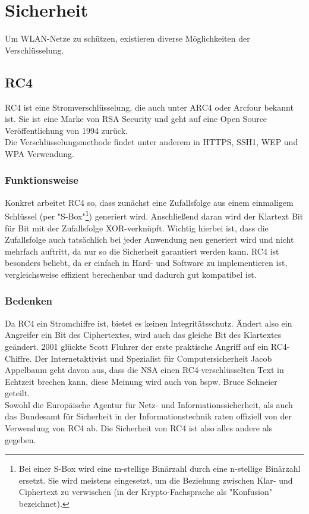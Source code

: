 \documentclass[a4paper,13pt]{scrartcl}
\begin{document}
\section{Sicherheit}
Um WLAN-Netze zu schützen, existieren diverse Möglichkeiten der Verschlüsselung. 
\subsection{RC4}
RC4 ist eine Stromverschlüsselung, die auch unter ARC4 oder Arcfour bekannt ist. Sie ist eine Marke von RSA Security und geht auf eine Open Source Veröffentlichung von 1994 zurück.\\
Die Verschlüsselungsmethode findet unter anderem in HTTPS, SSH1, WEP und WPA Verwendung.
\subsubsection{Funktionsweise}
Konkret arbeitet RC4 so, dass zunächst eine Zufallsfolge aus einem einmaligem Schlüssel (per "S-Box"\footnote{Bei einer S-Box wird eine m-stellige Binärzahl durch eine n-stellige Binärzahl ersetzt. Sie wird meistens eingesetzt, um die Beziehung zwischen Klar- und Ciphertext zu verwischen (in der Krypto-Fachsprache als "Konfusion" bezeichnet).}) generiert wird. Anschließend daran wird der Klartext Bit für Bit mit der Zufallsfolge XOR-verknüpft. Wichtig hierbei ist, dass die Zufallsfolge auch tatsächlich bei jeder Anwendung neu generiert wird und nicht mehrfach auftritt, da nur so die Sicherheit garantiert werden kann. RC4 ist besonders beliebt, da er einfach in Hard- und Software zu implementieren ist, vergleichsweise effizient berechenbar und dadurch gut kompatibel ist.
\subsubsection{Bedenken}
Da RC4 ein Stromchiffre ist, bietet es keinen Integritätsschutz. Ändert also ein Angreifer ein Bit des Ciphertextes, wird auch das gleiche Bit des Klartextes geändert. 2001 glückte Scott Fluhrer der erste praktische Angriff auf ein RC4-Chiffre. Der Internetaktivist und Spezialist für Computersicherheit Jacob Appelbaum geht davon aus, dass die NSA einen RC4-verschlüsselten Text in Echtzeit brechen kann, diese Meinung wird auch von bspw. Bruce Schneier geteilt.\\
Sowohl die Europäische Agentur für Netz- und Informationssicherheit, als auch das Bundesamt für Sicherheit in der Informationstechnik raten offiziell von der Verwendung von RC4 ab. Die Sicherheit von RC4 ist also alles andere als gegeben.
\end{document}

